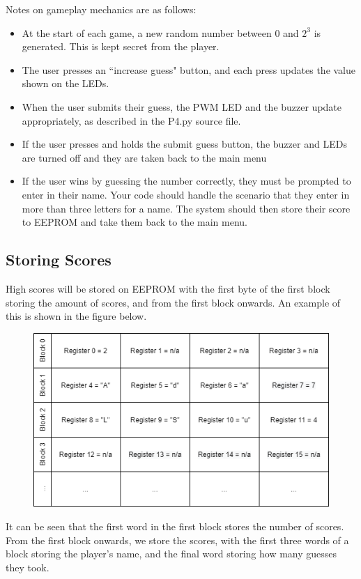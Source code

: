 Notes on gameplay mechanics are as follows:
\begin{itemize}
    \item At the start of each game, a new random number between 0 and $2^3$ is generated. This is kept secret from the player.
    \item The user presses an ``increase guess" button, and each press updates the value shown on the LEDs.
    \item When the user submits their guess, the PWM LED and the buzzer update appropriately, as described in the P4.py source file.
    \item If the user presses and holds the submit guess button, the buzzer and LEDs are turned off and they are taken back to the main menu
    \item If the user wins by guessing the number correctly, they must be prompted to enter in their name. Your code should handle the scenario that they enter in more than three letters for a name. The system should then store their score to EEPROM and take them back to the main menu.
\end{itemize}

\subsection{Storing Scores}
High scores will be stored on EEPROM with the first byte of the first block storing the amount of scores, and from the first block onwards. An example of this is shown in the figure below.

\begin{figure}[H]
\centering
\includegraphics[width=0.7\columnwidth]{Figures/EEPROMBlocks.png}
\end{figure}
It can be seen that the first word in the first block stores the number of scores.
From the first block onwards, we store the scores, with the first three words of a block storing the player's name, and the final word storing how many guesses they took.


